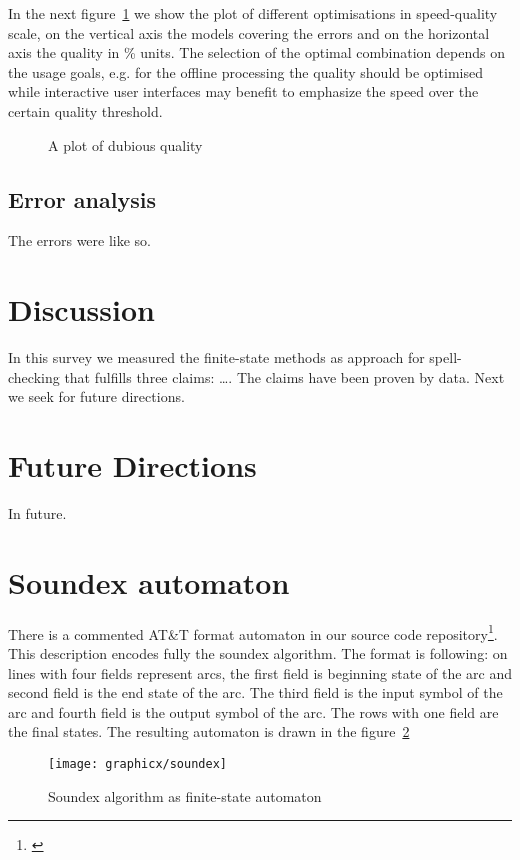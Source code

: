 \documentclass[a4paper,12pt]{article}
\begin{document}
In the next figure~\ref{fig:optimisation-speed-quality} we show the plot of
different optimisations in speed-quality scale, on the vertical axis the models
covering the errors and on the horizontal axis the quality in \% units. The
selection of the optimal combination depends on the usage goals, e.g. for the
offline processing the quality should be optimised while interactive user
interfaces may benefit to emphasize the speed over the certain quality
threshold.

\begin{figure}
    \centering
    \caption{A plot of dubious quality
    \label{fig:optimisation-speed-quality}}
\end{figure}

\subsection{Error analysis}
\label{subsec:error-analysis}

The errors were like so.

\section{Discussion}
\label{sec:discussion}

In this survey we measured the finite-state methods as approach for
spell-checking that fulfills three claims: \ldots. The claims have been proven
by data. Next we seek for future directions.

\section{Future Directions}
\label{sec:future}

In future.



\section*{Soundex automaton}
\label{appendix:soundex}

There is a commented AT\&T format automaton in our source code
repository\footnote{\url{}}. This description encodes fully the soundex
algorithm.  The format is following: on lines with four fields represent arcs,
the first field is beginning state of the arc and second field is the end state
of the arc. The third field is the input symbol of the arc and fourth field is
the output symbol of the arc. The rows with one field are the final states. The
resulting automaton is drawn in the figure~\ref{fig:soundex}

\begin{figure}
    \centering
    \texttt{[image: graphicx/soundex]}
    \caption{Soundex algorithm as finite-state automaton
    \label{fig:soundex}}
\end{figure}
\end{document}
